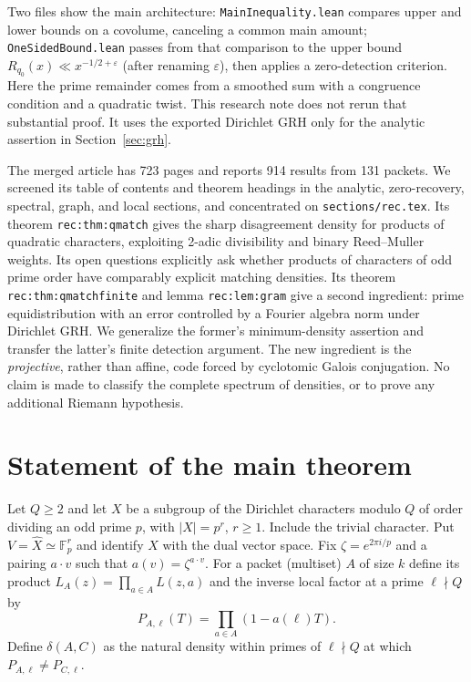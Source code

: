 \documentclass[11pt]{article}
\theoremstyle{definition}\newtheorem{definition}[theorem]{Definition}
\theoremstyle{remark}\newtheorem{remark}[theorem]{Remark}
\newcommand{\F}{\mathbb F}
\begin{document}
Two files show the main architecture: \texttt{MainInequality.lean} compares upper and lower bounds on a covolume, canceling a common main amount; \texttt{OneSidedBound.lean} passes from that comparison to the upper bound $R_{q_0}(x)\ll x^{-1/2+\varepsilon}$ (after renaming $\varepsilon$), then applies a zero-detection criterion. Here the prime remainder comes from a smoothed sum with a congruence condition and a quadratic twist. This research note does not rerun that substantial proof. It uses the exported Dirichlet GRH only for the analytic assertion in Section~\ref{sec:grh}.

The merged article has 723 pages and reports 914 results from 131 packets. We screened its table of contents and theorem headings in the analytic, zero-recovery, spectral, graph, and local sections, and concentrated on \texttt{sections/rec.tex}. Its theorem \texttt{rec:thm:qmatch} gives the sharp disagreement density for products of quadratic characters, exploiting 2-adic divisibility and binary Reed--Muller weights. Its open questions explicitly ask whether products of characters of odd prime order have comparably explicit matching densities. Its theorem \texttt{rec:thm:qmatchfinite} and lemma \texttt{rec:lem:gram} give a second ingredient: prime equidistribution with an error controlled by a Fourier algebra norm under Dirichlet GRH. We generalize the former's minimum-density assertion and transfer the latter's finite detection argument. The new ingredient is the \emph{projective}, rather than affine, code forced by cyclotomic Galois conjugation. No claim is made to classify the complete spectrum of densities, or to prove any additional Riemann hypothesis.

\section{Statement of the main theorem}
Let $Q\ge2$ and let $X$ be a subgroup of the Dirichlet characters modulo $Q$ of order dividing an odd prime $p$, with $|X|=p^r$, $r\ge1$. Include the trivial character. Put $V=\widehat X\simeq\F_p^r$ and identify $X$ with the dual vector space. Fix $\zeta=e^{2\pi i/p}$ and a pairing $a\cdot v$ such that $a(v)=\zeta^{a\cdot v}$. For a packet (multiset) $A$ of size $k$ define its product $L_A(z)=\prod_{a\in A}L(z,a)$ and the inverse local factor at a prime $\ell\nmid Q$ by
\[
 P_{A,\ell}(T)=\prod_{a\in A}(1-a(\ell)T).
\]
Define $\delta(A,C)$ as the natural density within primes of $\ell\nmid Q$ at which $P_{A,\ell}\ne P_{C,\ell}$.
\end{document}
